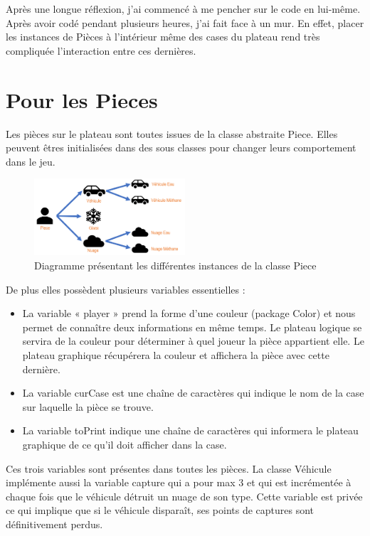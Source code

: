 \documentclass[titlepage]{report}
\begin{document}
Après une longue réflexion, j’ai commencé à me pencher sur le code en lui-même. Après avoir codé pendant plusieurs heures, j’ai fait face à un mur. En effet, placer les instances de Pièces à l’intérieur même des cases du plateau rend très compliquée l’interaction entre ces dernières. 

\section{Pour les Pieces}
Les pièces sur le plateau sont toutes issues de la classe abstraite Piece. Elles peuvent êtres initialisées dans des sous classes pour changer leurs comportement dans le jeu. \\

\begin{figure}
    \centering
    \includegraphics[width=0.5\textwidth]{img/schema_cases.PNG}
    \caption{Diagramme présentant les différentes instances de la classe Piece}
\end{figure}

\begin{samepage}
\noindent De plus elles possèdent plusieurs variables essentielles :\\
\begin{itemize}[label=$\bullet$]
    \setlength\itemsep{1em}
    \item La variable « player » prend la forme d’une couleur (package Color) et nous permet de connaître deux informations en même temps. Le plateau logique se servira de la couleur pour déterminer à quel joueur la pièce appartient elle. Le plateau graphique récupérera la couleur et affichera la pièce avec cette dernière.
    \item La variable curCase est une chaîne de caractères qui indique le nom de la case sur laquelle la pièce se trouve. 
    \item La variable toPrint indique une chaîne de caractères qui informera le plateau graphique de ce qu’il doit afficher dans la case.  
\end{itemize}
\end{samepage}

Ces trois variables sont présentes dans toutes les pièces. La classe Véhicule implémente aussi la variable capture qui a pour max 3 et qui est incrémentée à chaque fois que le véhicule détruit un nuage de son type. Cette variable est privée ce qui implique que si le véhicule disparaît, ses points de captures sont définitivement perdus. \\
\end{document}
